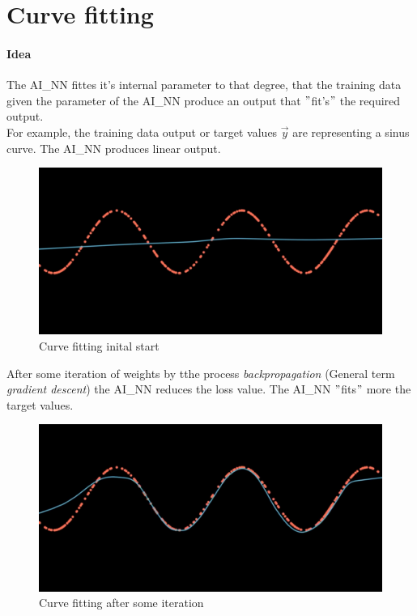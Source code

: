 



\section{Curve fitting}


\paragraph{Idea}
The \gls{AI_NN} fittes it's internal parameter to that degree, that the training data given the parameter of the \gls{AI_NN} produce an output that $"$fit's$"$ the required output.\\

For example, the training data output or target values $\vec{y}$ are representing a sinus curve. The \gls{AI_NN} produces linear output.
\begin{figure}[H]
	\centering
	\includegraphics[scale = 0.2]{attachment/chapter_AML/Scc032}
	\caption{Curve fitting inital start}
\end{figure}

After some iteration of weights by tthe process \textit{backpropagation} (General term  \textit{gradient descent}) the \gls{AI_NN} reduces the loss value. 
The \gls{AI_NN} $"$fits$"$ more the target values.
\begin{figure}[H]
	\centering
	\includegraphics[scale = 0.2]{attachment/chapter_AML/Scc033}
	\caption{Curve fitting after some iteration}
\end{figure}

